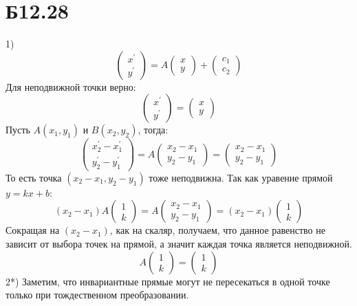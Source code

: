 \documentclass[a4paper,12pt]{article} %
\begin{document}
\section*{Б12.28}
1)$$\begin{pmatrix*}
    x^{\prime}\\y^{\prime}
\end{pmatrix*}=A\begin{pmatrix*}
    x\\y
\end{pmatrix*}+\begin{pmatrix*}
    c_1\\c_2
\end{pmatrix*}$$
Для неподвижной точки верно:
$$\begin{pmatrix*}
    x^{\prime}\\y^{\prime}
\end{pmatrix*}=\begin{pmatrix*}
    x\\y
\end{pmatrix*}$$
Пусть $A(x_1,y_1)$ и $B(x_2,y_2)$, тогда:$$\begin{pmatrix*}
    x^{\prime}_2-x^{\prime}_1\\y^{\prime}_2-y^{\prime}_1
\end{pmatrix*}=A\begin{pmatrix*}
    x_2-x_1\\y_2-y_1
\end{pmatrix*}=\begin{pmatrix*}
    x_2-x_1\\y_2-y_1
\end{pmatrix*}$$
То есть точка $(x_2-x_1,y_2-y_1)$ тоже неподвижна. Так как уравение прямой $y=kx+b$:$$(x_2-x_1)A\begin{pmatrix*}
    1\\k
\end{pmatrix*}=A\begin{pmatrix*}
    x_2-x_1\\y_2-y_1
\end{pmatrix*}=(x_2-x_1)\begin{pmatrix*}
    1\\k
\end{pmatrix*}$$
Сокращая на $(x_2-x_1)$, как на скаляр, получаем, что данное равенство не зависит от выбора точек на прямой, а значит каждая точка является неподвижной.
$$A\begin{pmatrix*}
    1\\k
\end{pmatrix*}=\begin{pmatrix*}
    1\\k
\end{pmatrix*}$$
2*) Заметим, что инвариантные прямые могут не пересекаться в одной точке только при тождественном преобразовании.
\end{document}
